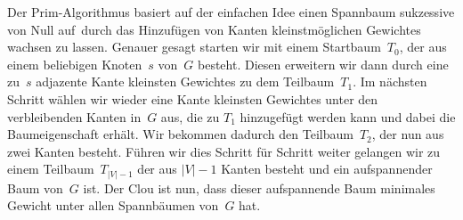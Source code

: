 \begin{bem}
Der Prim-Algorithmus basiert auf der einfachen Idee einen Spannbaum sukzessive \glqq von Null auf\grqq\ durch das Hinzufügen von Kanten kleinstmöglichen Gewichtes wachsen zu lassen.
Genauer gesagt starten wir mit einem Startbaum~$T_0$, der aus einem beliebigen Knoten~$s$ von~$G$ besteht.
Diesen erweitern wir dann durch eine zu~$s$ adjazente Kante kleinsten Gewichtes zu dem Teilbaum~$T_1$.
Im nächsten Schritt wählen wir wieder eine Kante kleinsten Gewichtes unter den verbleibenden Kanten in~$G$ aus, die zu $T_1$ hinzugefügt werden kann und dabei die Baumeigenschaft erhält.
Wir bekommen dadurch den Teilbaum~$T_2$, der nun aus zwei Kanten besteht.
Führen wir dies Schritt für Schritt weiter gelangen wir zu einem Teilbaum~$T_{|V|-1}$ der aus $|V|-1$ Kanten besteht und ein aufspannender Baum von~$G$ ist.
Der Clou ist nun, dass dieser aufspannende Baum minimales Gewicht unter allen Spannbäumen von~$G$ hat.
\end{bem} 


